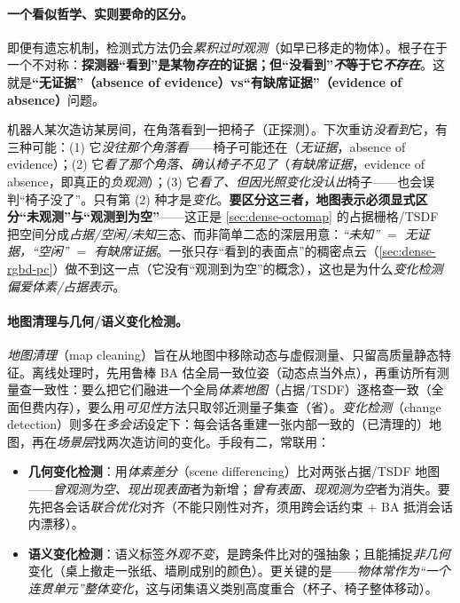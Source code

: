 \paragraph{一个看似哲学、实则要命的区分。}
即便有遗忘机制，检测式方法仍会\emph{累积过时观测}（如早已移走的物体）。根子在于一个不对称：\textbf{探测器“看到”是某物\emph{存在}的证据；但“没看到”\emph{不}等于它\emph{不存在}}\cite{schmid2026dynamic}。这就是\textbf{“无证据”（absence of evidence）vs“有缺席证据”（evidence of absence）}问题。

\begin{insight}
机器人某次造访某房间，在角落看到一把椅子（正探测）。下次重访\emph{没看到}它，有三种可能：(1) 它\emph{没往那个角落看}——椅子可能还在（\emph{无证据}，absence of evidence）；(2) 它\emph{看了那个角落、确认椅子不见了}（\emph{有缺席证据}，evidence of absence，即真正的\emph{负观测}）；(3) 它\emph{看了、但因光照变化没认出}椅子——也会误判“椅子没了”。只有第 (2) 种才是\emph{变化}。\textbf{要区分这三者，地图表示必须显式区分“未观测”与“观测到为空”}——这正是 \cref{sec:dense-octomap} 的占据栅格/TSDF 把空间分成\emph{占据/空闲/未知}三态、而非简单二态的深层用意：\emph{“未知” $=$ 无证据，“空闲” $=$ 有缺席证据}。一张只存“看到的表面点”的稠密点云（\cref{sec:dense-rgbd-pc}）做不到这一点（它没有“观测到为空”的概念），这也是为什么\emph{变化检测偏爱体素/占据表示}。
\end{insight}

\paragraph{地图清理与几何/语义变化检测。}
\emph{地图清理}（map cleaning）旨在从地图中移除动态与虚假测量、只留高质量静态特征。离线处理时，先用鲁棒 BA 估全局一致位姿（动态点当外点），再重访所有测量查一致性：要么把它们融进一个全局\emph{体素地图}（占据/TSDF）逐格查一致（全面但费内存），要么用\emph{可见性}方法只取邻近测量子集查（省）。\emph{变化检测}（change detection）则多在\emph{多会话}设定下：每会话各重建一张内部一致的（已清理的）地图，再在\emph{场景层}找两次造访间的变化。手段有二，常联用：
\begin{itemize}
  \item \textbf{几何变化检测}：用\emph{体素差分}（scene differencing）比对两张占据/TSDF 地图——\emph{曾观测为空、现出现表面}者为新增；\emph{曾有表面、现观测为空}者为消失。要先把各会话\emph{联合优化}对齐（不能只刚性对齐，须用跨会话约束 $+$ BA 抵消会话内漂移）。
  \item \textbf{语义变化检测}：语义标签\emph{外观不变}，是跨条件比对的强抽象；且能捕捉\emph{非几何}变化（桌上撤走一张纸、墙刷成别的颜色）。更关键的是——\emph{物体常作为“一个连贯单元”整体变化}，这与闭集语义类别高度重合（杯子、椅子整体移动）。
\end{itemize}

